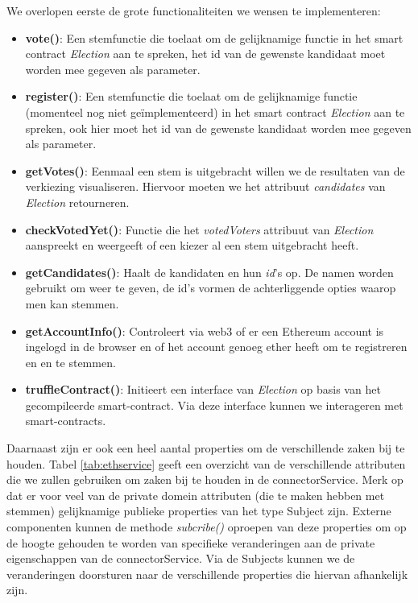 	We overlopen eerste de grote functionaliteiten we wensen te implementeren:
	\begin{itemize}
		\item \textbf{vote()}: Een stemfunctie die toelaat om  de gelijknamige functie in het smart contract \textit{Election} aan te spreken, het id van de gewenste kandidaat moet worden mee gegeven als parameter.
		\item \textbf{register()}: Een stemfunctie die toelaat om  de gelijknamige functie (momenteel nog niet geïmplementeerd) in het smart contract \textit{Election} aan te spreken, ook hier moet het id van de gewenste kandidaat worden mee gegeven als parameter.
		\item \textbf{getVotes()}: Eenmaal een stem is uitgebracht willen we de resultaten van de verkiezing visualiseren. Hiervoor moeten we het attribuut \textit{candidates} van \textit{Election} retourneren.
		\item \textbf{checkVotedYet()}: Functie die het \textit{votedVoters} attribuut van \textit{Election} aanspreekt en weergeeft of een kiezer al een stem uitgebracht heeft.
		\item \textbf{getCandidates()}: Haalt de kandidaten en hun \textit{id}'s op. De namen worden gebruikt om weer te geven, de id's vormen de achterliggende opties waarop men kan stemmen.
		\item \textbf{getAccountInfo()}: Controleert via web3 of er een Ethereum account is ingelogd in de browser en of het account genoeg ether heeft om te registreren en en te stemmen.
		\item \textbf{truffleContract()}: Initieert een interface van \textit{Election} op basis van het gecompileerde smart-contract. Via deze interface kunnen we  interageren met smart-contracts.
	\end{itemize}

Daarnaast zijn er ook een heel aantal properties om de verschillende zaken bij te houden. Tabel \ref{tab:ethservice} geeft een overzicht van de verschillende attributen die we zullen gebruiken om zaken bij te houden in de connectorService. 
Merk op dat er voor veel van de private domein attributen (die te maken hebben met stemmen) gelijknamige publieke properties van het type Subject zijn. Externe componenten kunnen de methode \textit{subcribe()} oproepen van deze properties om op de hoogte gehouden te worden van specifieke veranderingen aan de private eigenschappen van de connectorService. Via de Subjects kunnen we de veranderingen doorsturen naar de verschillende properties die hiervan afhankelijk zijn.

